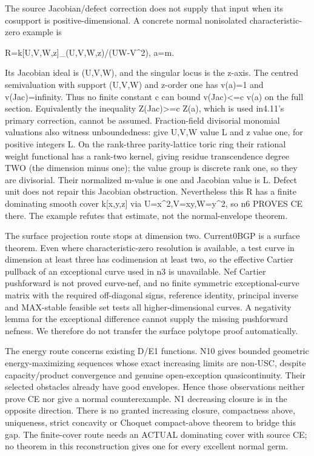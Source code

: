\documentclass[11pt]{article}
\begin{document}
The source Jacobian/defect correction does not supply that input when its cosupport is positive-dimensional. A concrete normal nonisolated characteristic-zero example is

    R=k[U,V,W,z]\_(U,V,W,z)/(UW-V\textasciicircum{}2),   a=m.

Its Jacobian ideal is (U,V,W), and the singular locus is the z-axis. The centred semivaluation with support (U,V,W) and z-order one has v(a)=1 and v(Jac)=infinity. Thus no finite constant c can bound v(Jac)<=c v(a) on the full section. Equivalently the inequality Z(Jac)>=c Z(a), which is used in4.11's primary correction, cannot be assumed. Fraction-field divisorial monomial valuations also witness unboundedness: give U,V,W value L and z value one, for positive integers L. On the rank-three parity-lattice toric ring their rational weight functional has a rank-two kernel, giving residue transcendence degree TWO (the dimension minus one); the value group is discrete rank one, so they are divisorial. Their normalized m-value is one and Jacobian value is L. Defect unit does not repair this Jacobian obstruction. Nevertheless this R has a finite dominating smooth cover k[x,y,z] via U=x\textasciicircum{}2,V=xy,W=y\textasciicircum{}2, so n6 PROVES CE there. The example refutes that estimate, not the normal-envelope theorem.

The surface projection route stops at dimension two. Current0BGP is a surface theorem. Even where characteristic-zero resolution is available, a test curve in dimension at least three has codimension at least two, so the effective Cartier pullback of an exceptional curve used in n3 is unavailable. Nef Cartier pushforward is not proved curve-nef, and no finite symmetric exceptional-curve matrix with the required off-diagonal signs, reference identity, principal inverse and MAX-stable feasible set tests all higher-dimensional curves. A negativity lemma for the exceptional difference cannot supply the missing pushforward nefness. We therefore do not transfer the surface polytope proof automatically.

The energy route concerns existing D/E1 functions. N10 gives bounded geometric energy-maximizing sequences whose exact increasing limits are non-USC, despite capacity/product convergence and genuine open-exception quasicontinuity. Their selected obstacles already have good envelopes. Hence those observations neither prove CE nor give a normal counterexample. N1 decreasing closure is in the opposite direction. There is no granted increasing closure, compactness above, uniqueness, strict concavity or Choquet compact-above theorem to bridge this gap. The finite-cover route needs an ACTUAL dominating cover with source CE; no theorem in this reconstruction gives one for every excellent normal germ.
\end{document}
